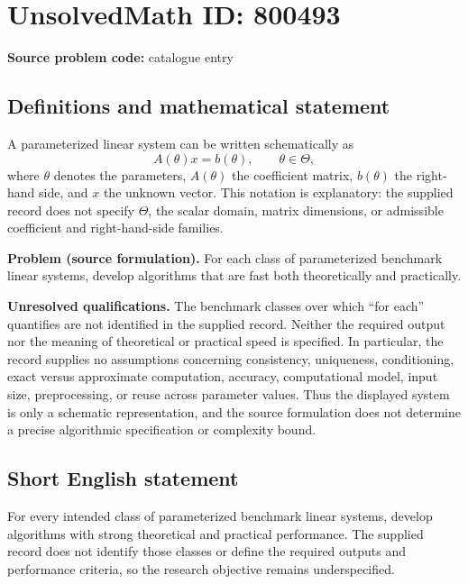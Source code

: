 \documentclass[11pt]{article}
\begin{document}
\section*{UnsolvedMath ID: 800493}
\textbf{Source problem code:} catalogue entry
\subsection{Definitions and mathematical statement}
A parameterized linear system can be written schematically as
\[
A(\theta)x=b(\theta),\qquad \theta\in\Theta,
\]
where \(\theta\) denotes the parameters, \(A(\theta)\) the coefficient matrix, \(b(\theta)\) the right-hand side, and \(x\) the unknown vector. This notation is explanatory: the supplied record does not specify \(\Theta\), the scalar domain, matrix dimensions, or admissible coefficient and right-hand-side families.

\textbf{Problem (source formulation).} For each class of parameterized benchmark linear systems, develop algorithms that are fast both theoretically and practically.

\textbf{Unresolved qualifications.} The benchmark classes over which ``for each'' quantifies are not identified in the supplied record. Neither the required output nor the meaning of theoretical or practical speed is specified. In particular, the record supplies no assumptions concerning consistency, uniqueness, conditioning, exact versus approximate computation, accuracy, computational model, input size, preprocessing, or reuse across parameter values. Thus the displayed system is only a schematic representation, and the source formulation does not determine a precise algorithmic specification or complexity bound.
\subsection{Short English statement}
For every intended class of parameterized benchmark linear systems, develop algorithms with strong theoretical and practical performance. The supplied record does not identify those classes or define the required outputs and performance criteria, so the research objective remains underspecified.
\end{document}

